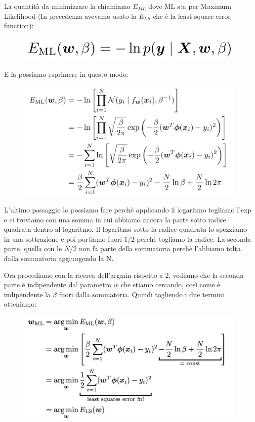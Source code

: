\documentclass[14pt]{extreport}
\begin{document}
La quantità da minimizzare la chiamiamo $E_{ML}$ dove ML sta per Maximum Likelihood (In precedenza avevamo usato la $E_{LS}$ che è la least square
error function):
\begin{figure}[H]
\centering
\includegraphics[width=0.4\linewidth]{108.jpeg}
\end{figure}

E la possiamo esprimere in questo modo:

\begin{figure}[H]
\centering
\includegraphics[width=0.6\linewidth]{109.jpeg}
\end{figure}

L'ultimo passaggio lo possiamo fare perchè applicando il logaritmo togliamo l'exp e ci troviamo con una somma in cui abbiamo ancora la parte sotto
radice quadrata dentro al logaritmo. Il logaritmo sotto la radice quadrata lo spezziamo in una sottrazione e poi portiamo fuori $1/2$ perchè togliamo
la radice. La seconda parte, quella con le $N/2$ non fa parte della sommatoria perchè l'abbiamo tolta dalla sommatoria aggiungendo la N.

Ora procediamo con la ricerca dell'argmin rispetto a 2, vediamo che la seconda parte è indipendente dal parametro $w$ che stiamo cercando, così come è
indipendente la $\beta$ fuori dalla sommatoria. Quindi togliendo i due termini otteniamo:

\begin{figure}[H]
\centering
\includegraphics[width=0.7\linewidth]{111.jpeg}
\end{figure}
\end{document}
